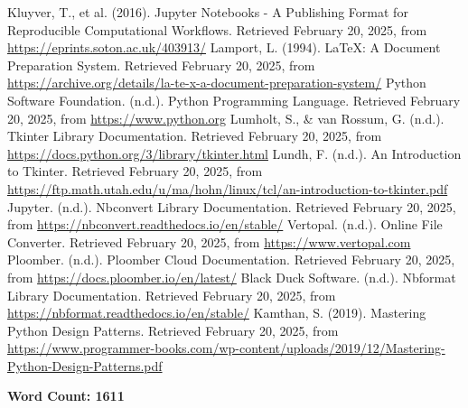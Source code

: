 \documentclass{article}
\begin{document}
\begin{multicols}{2}

\scriptsize
\begin{thebibliography}{10}
     Kluyver, T., et al. (2016). Jupyter Notebooks - A Publishing Format for Reproducible Computational Workflows. Retrieved February 20, 2025, from \url{https://eprints.soton.ac.uk/403913/}
     Lamport, L. (1994). LaTeX: A Document Preparation System. Retrieved February 20, 2025, from \url{https://archive.org/details/la-te-x-a-document-preparation-system/}
     Python Software Foundation. (n.d.). Python Programming Language. Retrieved February 20, 2025, from \url{https://www.python.org}
     Lumholt, S., \& van Rossum, G. (n.d.). Tkinter Library Documentation. Retrieved February 20, 2025, from \url{https://docs.python.org/3/library/tkinter.html}
     Lundh, F. (n.d.). An Introduction to Tkinter. Retrieved February 20, 2025, from \url{https://ftp.math.utah.edu/u/ma/hohn/linux/tcl/an-introduction-to-tkinter.pdf}
     Jupyter. (n.d.). Nbconvert Library Documentation. Retrieved February 20, 2025, from \url{https://nbconvert.readthedocs.io/en/stable/}
     Vertopal. (n.d.). Online File Converter. Retrieved February 20, 2025, from \url{https://www.vertopal.com}
     Ploomber. (n.d.). Ploomber Cloud Documentation. Retrieved February 20, 2025, from \url{https://docs.ploomber.io/en/latest/}
     Black Duck Software. (n.d.). Nbformat Library Documentation. Retrieved February 20, 2025, from \url{https://nbformat.readthedocs.io/en/stable/}
     Kamthan, S. (2019). Mastering Python Design Patterns. Retrieved February 20, 2025, from \url{https://www.programmer-books.com/wp-content/uploads/2019/12/Mastering-Python-Design-Patterns.pdf}
\end{thebibliography}

\end{multicols}

\hfill \textbf{Word Count: 1611}
\end{document}
